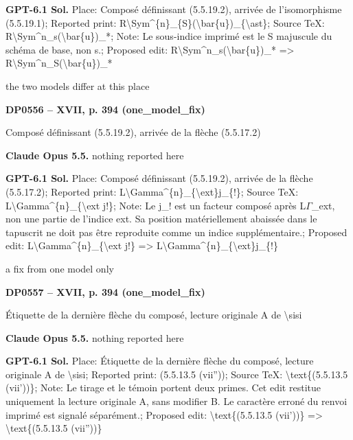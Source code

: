 \textbf{GPT-6.1 Sol.} Place: Composé définissant (5.5.19.2), arrivée de l'isomorphisme (5.5.19.1); Reported print: R\textbackslash{}Sym\textasciicircum{}\{n\}\_\{S\}(\textbackslash{}bar\{u\})\_\{\textbackslash{}ast\}; Source TeX: R\textbackslash{}Sym\textasciicircum{}n\_s(\textbackslash{}bar\{u\})\_*; Note: Le sous-indice imprimé est le S majuscule du schéma de base, non s.; Proposed edit: R\textbackslash{}Sym\textasciicircum{}n\_s(\textbackslash{}bar\{u\})\_* =\allowbreak > R\textbackslash{}Sym\textasciicircum{}n\_S(\textbackslash{}bar\{u\})\_*\par
the two models differ at this place\par
\par\noindent\hypertarget{DP0556}{}\textbf{DP0556 -- XVII, p. 394 (one\_model\_fix)}\par
Composé définissant (5.5.19.2), arrivée de la flèche (5.5.17.2)\par
\textbf{Claude Opus 5.5.} nothing reported here\par
\textbf{GPT-6.1 Sol.} Place: Composé définissant (5.5.19.2), arrivée de la flèche (5.5.17.2); Reported print: L\textbackslash{}Gamma\textasciicircum{}\{n\}\_\{\textbackslash{}ext\}j\_\{!\}; Source TeX: L\textbackslash{}Gamma\textasciicircum{}\{n\}\_\{\textbackslash{}ext j!\}; Note: Le j\_! est un facteur composé après L\ensuremath{\Gamma}\_ext, non une partie de l'indice ext. Sa position matériellement abaissée dans le tapuscrit ne doit pas être reproduite comme un indice supplémentaire.; Proposed edit: L\textbackslash{}Gamma\textasciicircum{}\{n\}\_\{\textbackslash{}ext j!\} =\allowbreak > L\textbackslash{}Gamma\textasciicircum{}\{n\}\_\{\textbackslash{}ext\}j\_\{!\}\par
a fix from one model only\par
\par\noindent\hypertarget{DP0557}{}\textbf{DP0557 -- XVII, p. 394 (one\_model\_fix)}\par
Étiquette de la dernière flèche du composé, lecture originale A de \textbackslash{}sisi\par
\textbf{Claude Opus 5.5.} nothing reported here\par
\textbf{GPT-6.1 Sol.} Place: Étiquette de la dernière flèche du composé, lecture originale A de \textbackslash{}sisi; Reported print: (5.5.13.5 (vii'')); Source TeX: \textbackslash{}text\{(5.5.13.5 (vii'))\}; Note: Le tirage et le témoin portent deux primes. Cet edit restitue uniquement la lecture originale A, sans modifier B. Le caractère erroné du renvoi imprimé est signalé séparément.; Proposed edit: \textbackslash{}text\{(5.5.13.5 (vii'))\} =\allowbreak > \textbackslash{}text\{(5.5.13.5 (vii''))\}\par
